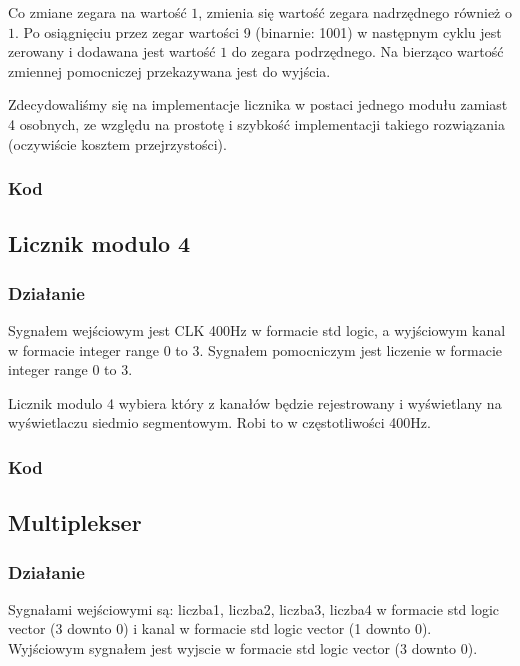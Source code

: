 \vspace*{0.2cm}

\hspace*{0.5cm}Co zmiane zegara na wartość $1$, zmienia się wartość zegara nadrzędnego również o $1$. Po osiągnięciu przez zegar wartości 9 (binarnie: 1001) w następnym cyklu jest zerowany i dodawana jest wartość $1$ do zegara podrzędnego. Na bierząco wartość zmiennej pomocniczej przekazywana jest do wyjścia.

\vspace*{0.5cm}

\hspace*{0.5cm}Zdecydowaliśmy się na implementacje licznika w postaci jednego modułu zamiast 4 osobnych, ze względu na prostotę i szybkość implementacji takiego rozwiązania (oczywiście kosztem przejrzystości).
\subsubsection{Kod}


\subsection{Licznik modulo 4}
\subsubsection{Działanie}
\hspace*{0.5cm}Sygnałem wejściowym jest CLK 400Hz w formacie std logic, a wyjściowym kanal w formacie integer range 0 to 3. Sygnałem pomocniczym jest liczenie w formacie integer range 0 to 3.

\vspace*{0.5cm}

\hspace*{0.5cm}Licznik modulo 4 wybiera który z kanałów będzie rejestrowany i wyświetlany na wyświetlaczu siedmio segmentowym. Robi to w częstotliwości 400Hz. 
\subsubsection{Kod}


\subsection{Multiplekser}
\subsubsection{Działanie}
\hspace*{0.5cm}Sygnałami wejściowymi są: liczba1, liczba2, liczba3, liczba4 w formacie std logic vector (3 downto 0) i kanal w formacie std logic vector (1 downto 0). Wyjściowym sygnałem jest wyjscie w formacie std logic vector (3 downto 0).

